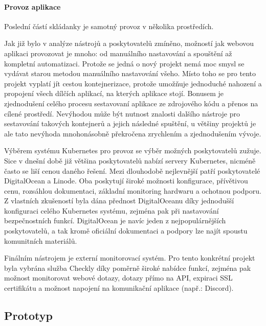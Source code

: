 			\paragraph{Provoz aplikace}

			Poslední částí skládanky je samotný provoz v několika prostředích.

			Jak již bylo v analýze nástrojů a poskytovatelů zmíněno, možností jak webovou aplikaci provozovat je mnoho: od
			manuálního nastavování a spouštění až kompletní automatizaci.
			Protože se jedná o nový projekt nemá moc smysl se vydávat starou metodou manuálního nastavování všeho.
			Místo toho se pro tento projekt vyplatí jít cestou kontejnerizace, protože umožňuje jednoduché nahození a propojení
			všech dílčích aplikací, na kterých aplikace stojí.
			Bonusem je zjednodušení celého procesu sestavovaní aplikace ze zdrojového kódu a přenos
			na cílené prostředí.
			Nevýhodou může být nutnost znalosti dalšího nástroje pro sestavování takových kontejnerů a jejich následné spuštění, u většiny
			projektů je ale tato nevýhoda mnohonásobně překročena zrychlením a zjednodušením vývoje.

			Výběrem systému Kubernetes pro provoz se výběr možných poskytovatelů zužuje.
			Sice v dnešní době již většina poskytovatelů nabízí servery Kubernetes, nicméně často se liší cenou daného řešení.
			Mezi dlouhodobě nejlevnější patří poskytovatelé DigitalOcean a Linode.
			Oba poskytují široké možnosti konfigurace, přívětivou cenu, rozsáhlou dokumentaci, základní monitoring hardwaru
			a ochotnou podporu.
			Z vlastních zkušeností byla dána přednost DigitalOceanu díky jednodušší konfiguraci celého Kubernetes systému,
			zejména pak při nastavování bezpečnostních funkcí.
			DigitalOcean je navíc jeden z nejpopulárnějších poskytovatelů, a tak kromě oficiální dokumentaci a podpory lze
			najít spoustu komunitních materiálů.

			Finálním nástrojem je externí monitorovací systém.
			Pro tento konkrétní projekt byla vybrána služba Checkly díky poměrně široké nabídce funkcí, zejména pak
			možnost monitorovat webové dotazy, dotazy přímo na \ac{API}, expiraci SSL certifikátu a možnost napojení na
			komunikační aplikace (např.: Discord).

	\subsection{Prototyp}

